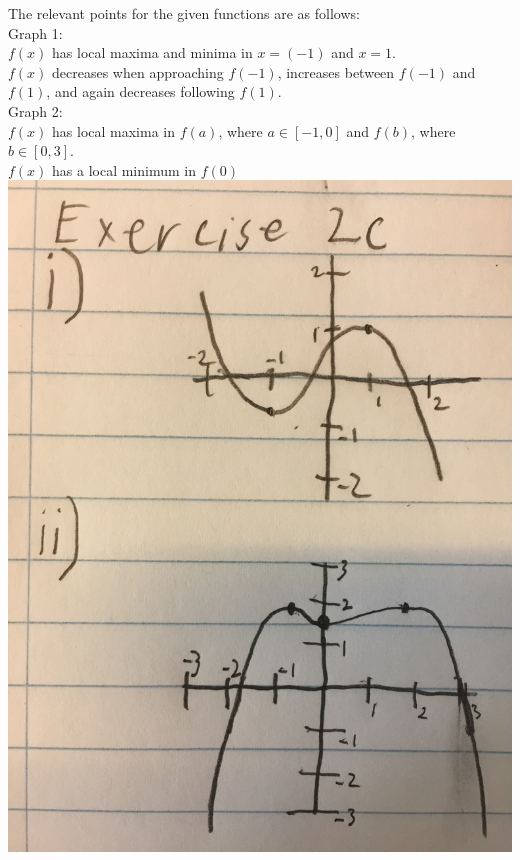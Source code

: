 The relevant points for the given functions are as follows:\\
Graph 1:\\
$f(x)$ has local maxima and minima in $x=(-1)$ and $x=1$.\\
$f(x)$ decreases when approaching $f(-1)$, increases between $f(-1)$ and $f(1)$, and again decreases following $f(1)$.\\
Graph 2:\\
$f(x)$ has local maxima in $f(a)$, where $a \in [-1,0]$ and $f(b)$, where $b \in [0,3]$.\\
$f(x)$ has a local minimum in $f(0)$\\
\includegraphics[width=0.5\linewidth]{masd2c.jpg}